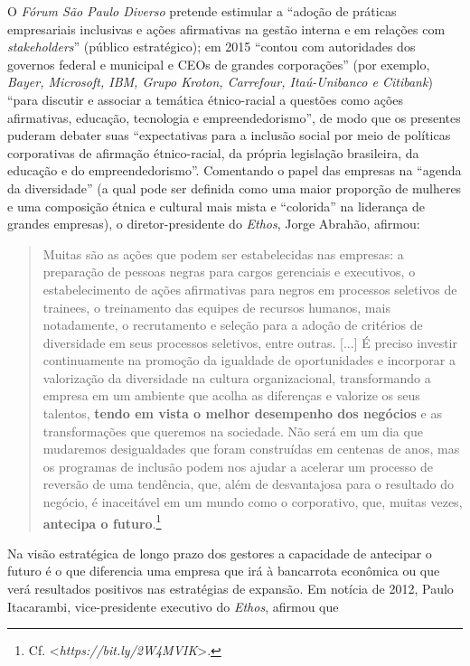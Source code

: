 O \emph{Fórum São Paulo Diverso} pretende estimular a ``adoção de
práticas empresariais inclusivas e ações afirmativas na gestão interna e
em relações com \emph{stakeholders}'' (público estratégico); em 2015
``contou com autoridades dos governos federal e municipal e CEOs de
grandes corporações'' (por exemplo, \emph{Bayer, Microsoft, IBM, Grupo
Kroton, Carrefour, Itaú-Unibanco e Citibank}) ``para discutir e associar
a temática étnico-racial a questões como ações afirmativas, educação,
tecnologia e empreendedorismo'', de modo que os presentes puderam
debater suas ``expectativas para a inclusão social por meio de políticas
corporativas de afirmação étnico-racial, da própria legislação
brasileira, da educação e do empreendedorismo''. Comentando o papel das
empresas na ``agenda da diversidade'' (a qual pode ser definida como uma
maior proporção de mulheres e uma composição étnica e cultural mais
mista e ``colorida'' na liderança de grandes empresas), o
diretor-presidente do \emph{Ethos}, Jorge Abrahão, afirmou:

\begin{quote}
Muitas são as ações que podem ser estabelecidas nas empresas: a
preparação de pessoas negras para cargos gerenciais e executivos, o
estabelecimento de ações afirmativas para negros em processos seletivos
de trainees, o treinamento das equipes de recursos humanos, mais
notadamente, o recrutamento e seleção para a adoção de critérios de
diversidade em seus processos seletivos, entre outras. {[}...{]} É
preciso investir continuamente na promoção da igualdade de oportunidades
e incorporar a valorização da diversidade na cultura organizacional,
transformando a empresa em um ambiente que acolha as diferenças e
valorize os seus talentos, \textbf{tendo em vista o melhor desempenho
dos negócios} e as transformações que queremos na sociedade. Não será em
um dia que mudaremos desigualdades que foram construídas em centenas de
anos, mas os programas de inclusão podem nos ajudar a acelerar um
processo de reversão de uma tendência, que, além de desvantajosa para o
resultado do negócio, é inaceitável em um mundo como o corporativo, que,
muitas vezes, \textbf{antecipa o futuro}.\footnote{Cf.
  \textless{}\emph{https://bit.ly/2W4MVIK}\textgreater{}.}
\end{quote}

Na visão estratégica de longo prazo dos gestores a capacidade de
antecipar o futuro é o que diferencia uma empresa que irá à bancarrota
econômica ou que verá resultados positivos nas estratégias de expansão.
Em notícia de 2012, Paulo Itacarambi, vice-presidente executivo do
\emph{Ethos}, afirmou que

